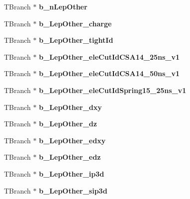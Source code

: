 \begin{DoxyCompactItemize}
T\+Branch $\ast$ {\bfseries b\+\_\+n\+Lep\+Other}
\item 
\hypertarget{classMiniTree_ae7b2e262393a1c08dba6d4dfdc1c48fd}{}\label{classMiniTree_ae7b2e262393a1c08dba6d4dfdc1c48fd} 
T\+Branch $\ast$ {\bfseries b\+\_\+\+Lep\+Other\+\_\+charge}
\item 
\hypertarget{classMiniTree_ae9ef2fbfa80e352a93e299b96d2de717}{}\label{classMiniTree_ae9ef2fbfa80e352a93e299b96d2de717} 
T\+Branch $\ast$ {\bfseries b\+\_\+\+Lep\+Other\+\_\+tight\+Id}
\item 
\hypertarget{classMiniTree_a155db3d0128e770843516872a39c64d6}{}\label{classMiniTree_a155db3d0128e770843516872a39c64d6} 
T\+Branch $\ast$ {\bfseries b\+\_\+\+Lep\+Other\+\_\+ele\+Cut\+Id\+C\+S\+A14\+\_\+25ns\+\_\+v1}
\item 
\hypertarget{classMiniTree_a532c458bea3d1b9dc03c128d2d19a70d}{}\label{classMiniTree_a532c458bea3d1b9dc03c128d2d19a70d} 
T\+Branch $\ast$ {\bfseries b\+\_\+\+Lep\+Other\+\_\+ele\+Cut\+Id\+C\+S\+A14\+\_\+50ns\+\_\+v1}
\item 
\hypertarget{classMiniTree_a38a9f2eb2860f3e3710d0b780cd7eff2}{}\label{classMiniTree_a38a9f2eb2860f3e3710d0b780cd7eff2} 
T\+Branch $\ast$ {\bfseries b\+\_\+\+Lep\+Other\+\_\+ele\+Cut\+Id\+Spring15\+\_\+25ns\+\_\+v1}
\item 
\hypertarget{classMiniTree_a28d1ffab3d5cb483560c073aba26683f}{}\label{classMiniTree_a28d1ffab3d5cb483560c073aba26683f} 
T\+Branch $\ast$ {\bfseries b\+\_\+\+Lep\+Other\+\_\+dxy}
\item 
\hypertarget{classMiniTree_af3559adc44aad2a88041ca9b6b09d709}{}\label{classMiniTree_af3559adc44aad2a88041ca9b6b09d709} 
T\+Branch $\ast$ {\bfseries b\+\_\+\+Lep\+Other\+\_\+dz}
\item 
\hypertarget{classMiniTree_a26a1d14dd3fcdcac74476603f48e6c4d}{}\label{classMiniTree_a26a1d14dd3fcdcac74476603f48e6c4d} 
T\+Branch $\ast$ {\bfseries b\+\_\+\+Lep\+Other\+\_\+edxy}
\item 
\hypertarget{classMiniTree_aa4d0b74d265122846799648f0f1e6a8c}{}\label{classMiniTree_aa4d0b74d265122846799648f0f1e6a8c} 
T\+Branch $\ast$ {\bfseries b\+\_\+\+Lep\+Other\+\_\+edz}
\item 
\hypertarget{classMiniTree_a8d7f318553b4b6fe3edd91543590f891}{}\label{classMiniTree_a8d7f318553b4b6fe3edd91543590f891} 
T\+Branch $\ast$ {\bfseries b\+\_\+\+Lep\+Other\+\_\+ip3d}
\item 
\hypertarget{classMiniTree_a24a71cad2b698177311a05243ef5676d}{}\label{classMiniTree_a24a71cad2b698177311a05243ef5676d} 
T\+Branch $\ast$ {\bfseries b\+\_\+\+Lep\+Other\+\_\+sip3d}

\end{DoxyCompactItemize}

